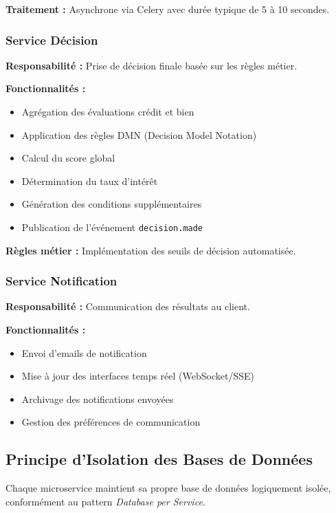 \documentclass[12pt,a4paper]{article}
\begin{document}
\textbf{Traitement :} Asynchrone via Celery avec durée typique de 5 à 10 secondes.

\subsubsection{Service Décision}

\textbf{Responsabilité :} Prise de décision finale basée sur les règles métier.

\textbf{Fonctionnalités :}
\begin{itemize}
    \item Agrégation des évaluations crédit et bien
    \item Application des règles DMN (Decision Model Notation)
    \item Calcul du score global
    \item Détermination du taux d'intérêt
    \item Génération des conditions supplémentaires
    \item Publication de l'événement \texttt{decision.made}
\end{itemize}

\textbf{Règles métier :} Implémentation des seuils de décision automatisée.

\subsubsection{Service Notification}

\textbf{Responsabilité :} Communication des résultats au client.

\textbf{Fonctionnalités :}
\begin{itemize}
    \item Envoi d'emails de notification
    \item Mise à jour des interfaces temps réel (WebSocket/SSE)
    \item Archivage des notifications envoyées
    \item Gestion des préférences de communication
\end{itemize}

\subsection{Principe d'Isolation des Bases de Données}

Chaque microservice maintient sa propre base de données logiquement isolée, conformément au pattern \textit{Database per Service}.
\end{document}

